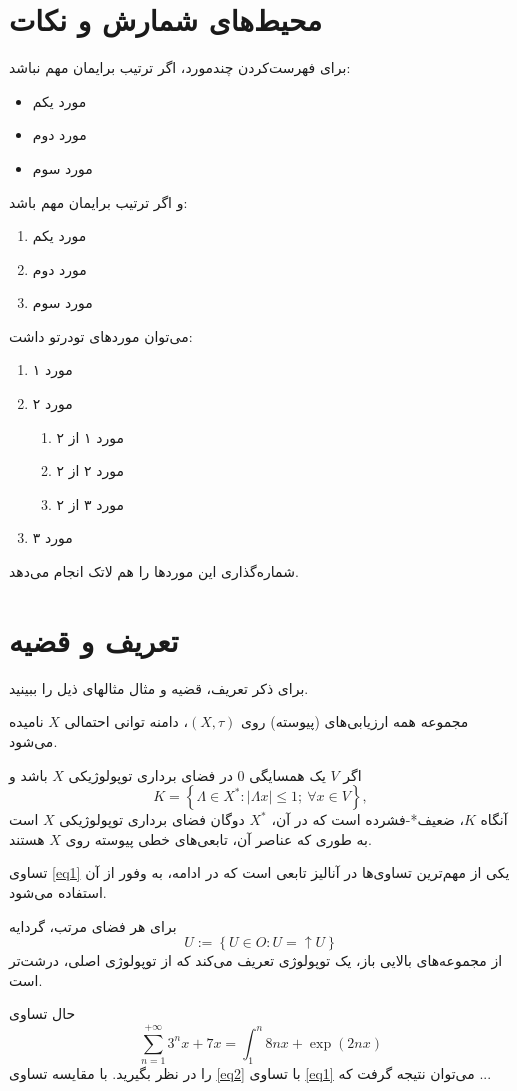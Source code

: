 \section{محیط‌های شمارش و نکات}
برای فهرست‌کردن چندمورد، اگر ترتیب برایمان مهم نباشد:
\begin{itemize}
	\item مورد یکم
	\item مورد دوم
	\item مورد سوم
\end{itemize}
و اگر ترتیب برایمان مهم باشد:
\begin{enumerate}
	\item مورد یکم
	\item مورد دوم
	\item مورد سوم
\end{enumerate}
می‌توان موردهای تودرتو داشت:
\begin{enumerate}
	\item مورد ۱
	\item مورد ۲
	\begin{enumerate}
		\item مورد ۱ از ۲
		\item مورد ۲ از ۲
		\item مورد ۳ از ۲
	\end{enumerate}
	\item مورد ۳
\end{enumerate}
شماره‌گذاری این موردها را هم لاتک انجام می‌دهد.

\section{تعریف و قضیه}\label{app:index}
برای ذکر تعریف، قضیه و مثال مثالهای ذیل را ببینید.
\begin{definition}
	مجموعه همه ارزیابی‌های (پیوسته) روی $(X,\tau)$، دامنه توانی احتمالی
	$ X $
	نامیده می‌شود.
\end{definition}
\begin{theorem}
	اگر $ V $ یک همسایگی $ 0 $ در فضای برداری
	توپولوژیکی $ X $ باشد و
	\begin{equation}\label{eq1}
		K=\left\lbrace \Lambda \in X^{*}:|\Lambda x|\leqslant 1 ; \ \forall x\in V\right\rbrace,
	\end{equation}
	آنگاه $ K $، ضعیف*-فشرده است که در آن، $ X^{*} $ دوگان
	فضای برداری توپولوژیکی $ X $ است به ‌طوری که عناصر آن، تابعی‌های
	خطی پیوسته
	روی $X$ هستند.
\end{theorem}
تساوی \eqref{eq1} یکی از مهم‌ترین تساوی‌ها در آنالیز تابعی است که در ادامه، به وفور از آن استفاده می‌شود.
\begin{example}
	برای هر فضای مرتب، گردایه
	$$U:=\left\lbrace U\in O: U=\uparrow U\right\rbrace $$
	از مجموعه‌های بالایی باز، یک توپولوژی تعریف می‌کند که از توپولوژی اصلی، درشت‌تر است.
\end{example}
حال تساوی
\begin{equation}\label{eq2}
	\sum_{n=1}^{+\infty} 3^{n}x+7x=\int_{1}^{n}8nx+\exp{(2nx)}
\end{equation}
را در نظر بگیرید. با مقایسه تساوی \eqref{eq2} با تساوی \eqref{eq1} می‌توان نتیجه گرفت که ...


